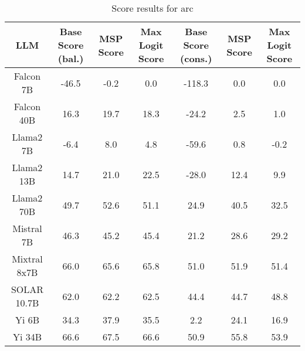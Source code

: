\renewcommand\arraystretch{1.2}
\begin{table*}
\centering
\begin{tabular}{c|c|c|c|c|c|c}
LLM & Base Score (bal.) & MSP Score & Max Logit Score & Base Score (cons.) & MSP Score & Max Logit Score\\ \hline
Falcon 7B & -46.5 & -0.2 & 0.0 & -118.3 & 0.0 & 0.0\\
Falcon 40B & 16.3 & 19.7 & 18.3 & -24.2 & 2.5 & 1.0\\
Llama2 7B & -6.4 & 8.0 & 4.8 & -59.6 & 0.8 & -0.2\\
Llama2 13B & 14.7 & 21.0 & 22.5 & -28.0 & 12.4 & 9.9\\
Llama2 70B & 49.7 & 52.6 & 51.1 & 24.9 & 40.5 & 32.5\\
Mistral 7B & 46.3 & 45.2 & 45.4 & 21.2 & 28.6 & 29.2\\
Mixtral 8x7B & 66.0 & 65.6 & 65.8 & 51.0 & 51.9 & 51.4\\
SOLAR 10.7B & 62.0 & 62.2 & 62.5 & 44.4 & 44.7 & 48.8\\
Yi 6B & 34.3 & 37.9 & 35.5 & 2.2 & 24.1 & 16.9\\
Yi 34B & 66.6 & 67.5 & 66.6 & 50.9 & 55.8 & 53.9\\
\hline
\end{tabular}
\caption{Score results for arc}
\end{table*}
\label{tab:arc_score}
